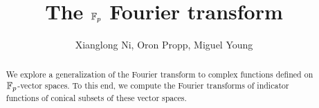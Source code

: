 \documentclass[10pt,a4paper]{amsart}
\begin{document}
	\title{The $\mathbb{F}_p$ Fourier transform}
	\author{Xianglong Ni, Oron Propp, Miguel Young }
	
	\maketitle
	
	\begin{abstract}
	    We explore a generalization of the Fourier transform to complex
	    functions defined on $\mathbb{F}_p$-vector spaces. To this end, we compute the Fourier
	    transforms of indicator functions of conical subsets of these vector spaces.
	\end{abstract}
	
	\tableofcontents

    
    
	
	
    
	\clearpage
	\appendix
	

    
	
\end{document}
